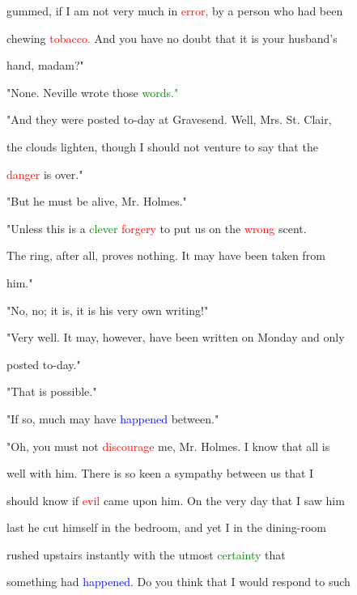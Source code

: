  gummed, if I am not very much in \textcolor{red}{error,} by a person who had been

 chewing \textcolor{red}{tobacco.} And you have no \textcolor{BurntOrange}{doubt} that it is your husband's

 hand, madam?"



 "None. Neville wrote those \textcolor{green}{words."}



 "And they were posted to-day at Gravesend. Well, Mrs. St. Clair,

 the clouds lighten, though I should not venture to say that the

 \textcolor{red}{danger} is over."



 "But he must be \textcolor{BurntOrange}{alive,} Mr. Holmes."



 "Unless this is a \textcolor{green}{clever} \textcolor{red}{forgery} to put us on the \textcolor{red}{wrong} scent.

 The ring, after all, proves nothing. It may have been taken from

 him."



 "No, no; it is, it is his very own writing!"



 "Very well. It may, however, have been written on Monday and only

 posted to-day."



 "That is possible."



 "If so, much may have \textcolor{blue}{happened} between."



 "Oh, you must not \textcolor{red}{discourage} me, Mr. Holmes. I know that all is

 well with him. There is so keen a \textcolor{BurntOrange}{sympathy} between us that I

 should know if \textcolor{red}{evil} came upon him. On the very day that I saw him

 last he cut himself in the bedroom, and yet I in the dining-room

 rushed upstairs instantly with the utmost \textcolor{green}{certainty} that

 something had \textcolor{blue}{happened.} Do you think that I would respond to such

